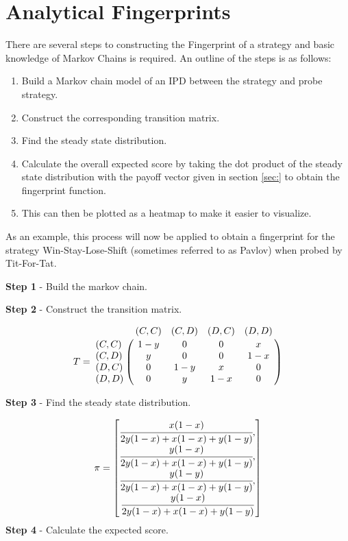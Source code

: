 \section{Analytical Fingerprints}\label{sec:analytical-fingerprints}
There are several steps to constructing the Fingerprint of a strategy and basic knowledge of Markov Chains is required.
An outline of the steps is as follows:

\begin{enumerate}
    \item Build a Markov chain model of an IPD between the strategy and probe strategy.
    \item Construct the corresponding transition matrix.
    \item Find the steady state distribution.
    \item Calculate the overall expected score by taking the dot product of the steady state distribution with the payoff vector given in section \ref{sec:} to obtain the fingerprint function.
    \item This can then be plotted as a heatmap to make it easier to visualize.
\end{enumerate}

As an example, this process will now be applied to obtain a fingerprint for the strategy Win-Stay-Lose-Shift (sometimes referred to as Pavlov) when probed by Tit-For-Tat.

\textbf{Step 1} - Build the markov chain.

\textbf{Step 2} - Construct the transition matrix.

\begin{equation}\label{eq:transition_matrix}
%
T = \bordermatrix{~      & (C, C) & (C, D) & (D, C) & (D, D) \cr
                  (C, C) & 1 - y  & 0      & 0      & x      \cr
                  (C, D) & y      & 0      & 0      & 1 - x  \cr
                  (D, C) & 0      & 1 - y  & x      & 0      \cr
                  (D, D) & 0      & y      & 1 - x  & 0}
%
\end{equation}

\textbf{Step 3} - Find the steady state distribution.

\begin{equation}\label{eq:steady_state}
%
\pi =
\begin{bmatrix}
\cfrac{x (1 - x)}{2y(1-x) + x(1-x) + y(1-y)}, \\
\cfrac{y (1 - x)}{2y(1-x) + x(1-x) + y(1-y)}, \\
\cfrac{y (1 - y)}{2y(1-x) + x(1-x) + y(1-y)}, \\
\cfrac{y (1 - x)}{2y(1-x) + x(1-x) + y(1-y)}
\end{bmatrix}
\end{equation}
\textbf{Step 4} - Calculate the expected score.

